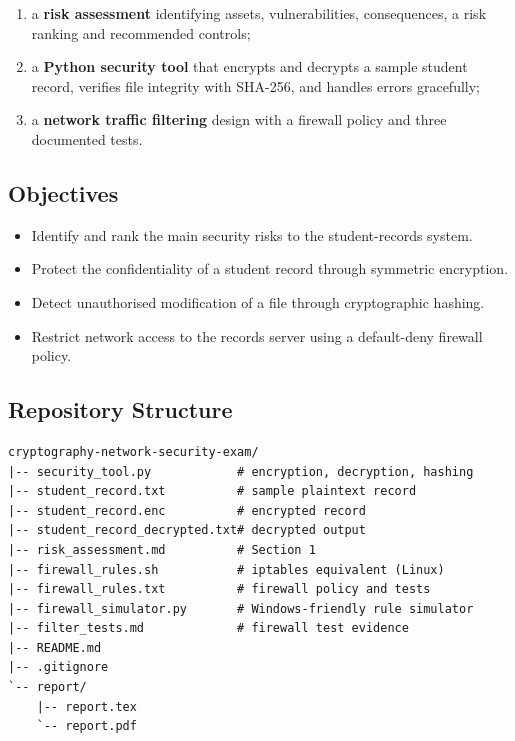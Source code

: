 \documentclass[11pt,a4paper]{article}
\begin{document}
\begin{enumerate}[leftmargin=*]
  \item a \textbf{risk assessment} identifying assets, vulnerabilities,
        consequences, a risk ranking and recommended controls;
  \item a \textbf{Python security tool} that encrypts and decrypts a sample
        student record, verifies file integrity with SHA-256, and handles errors
        gracefully;
  \item a \textbf{network traffic filtering} design with a firewall policy
        and three documented tests.
\end{enumerate}

\subsection{Objectives}
\begin{itemize}[leftmargin=*]
  \item Identify and rank the main security risks to the student-records system.
  \item Protect the confidentiality of a student record through symmetric encryption.
  \item Detect unauthorised modification of a file through cryptographic hashing.
  \item Restrict network access to the records server using a default-deny firewall policy.
\end{itemize}

\subsection{Repository Structure}
\begin{lstlisting}[numbers=none,language={}]
cryptography-network-security-exam/
|-- security_tool.py            # encryption, decryption, hashing
|-- student_record.txt          # sample plaintext record
|-- student_record.enc          # encrypted record
|-- student_record_decrypted.txt# decrypted output
|-- risk_assessment.md          # Section 1
|-- firewall_rules.sh           # iptables equivalent (Linux)
|-- firewall_rules.txt          # firewall policy and tests
|-- firewall_simulator.py       # Windows-friendly rule simulator
|-- filter_tests.md             # firewall test evidence
|-- README.md
|-- .gitignore
`-- report/
    |-- report.tex
    `-- report.pdf
\end{lstlisting}

\end{document}
